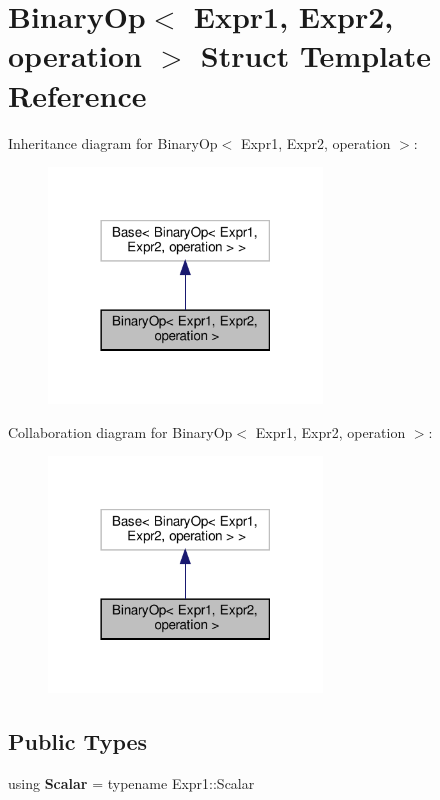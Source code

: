 \hypertarget{structBinaryOp}{}\section{Binary\+Op$<$ Expr1, Expr2, operation $>$ Struct Template Reference}
\label{structBinaryOp}


Inheritance diagram for Binary\+Op$<$ Expr1, Expr2, operation $>$\+:
\nopagebreak
\begin{figure}[H]
\begin{center}
\leavevmode
\includegraphics[width=206pt]{structBinaryOp__inherit__graph}
\end{center}
\end{figure}


Collaboration diagram for Binary\+Op$<$ Expr1, Expr2, operation $>$\+:
\nopagebreak
\begin{figure}[H]
\begin{center}
\leavevmode
\includegraphics[width=206pt]{structBinaryOp__coll__graph}
\end{center}
\end{figure}
\subsection*{Public Types}
\begin{DoxyCompactItemize}
\item 
\mbox{\label{structBinaryOp_aa0a5ecc4e1659195bf8c46f70f52adf0}} 
using {\bfseries Scalar} = typename Expr1\+::\+Scalar
\end{DoxyCompactItemize}

